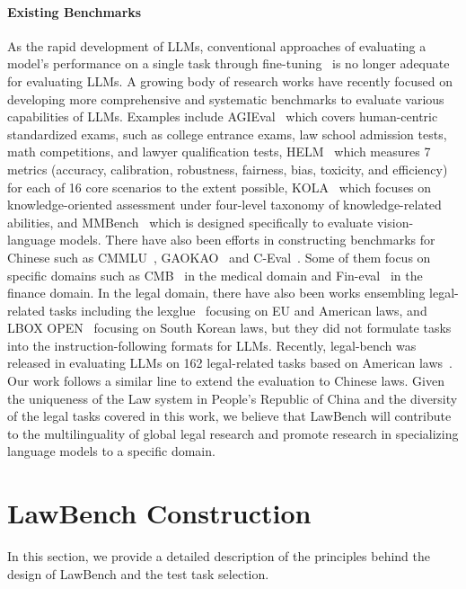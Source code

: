 \paragraph{Existing Benchmarks}

As the rapid development of LLMs, conventional approaches of evaluating a model's performance on a single task through fine-tuning~\cite{xu2020clue,wang2018glue,louis2022statutory,zhang2022mdia,shen2023xpqa} is no longer adequate for evaluating LLMs. A growing body of research works have recently focused on developing more comprehensive and systematic benchmarks to evaluate various capabilities of LLMs. Examples include AGIEval~\cite{zhong2023agieval} which covers human-centric standardized exams, such as college entrance exams, law school admission tests, math competitions, and lawyer qualification tests, HELM~\cite{liang2022holistic} which measures 7 metrics (accuracy, calibration, robustness,
fairness, bias, toxicity, and efficiency) for each of 16 core scenarios to the extent possible, KOLA~\cite{yu2023kola} which focuses on knowledge-oriented assessment under four-level taxonomy of knowledge-related abilities, and MMBench~\cite{liu2023mmbench} which is designed specifically to evaluate vision-language models. There have also been efforts in constructing benchmarks for Chinese such as CMMLU~\cite{li2023cmmlu}, GAOKAO~\cite{zhang2023evaluating} and C-Eval~\cite{huang2023c}. Some of them focus on specific domains such as CMB~\cite{wang2023cmb} in the medical domain and Fin-eval~\cite{zhang2023fineval} in the finance domain. In the legal domain, there have also been works ensembling legal-related tasks including the lexglue~\cite{chalkidis2022lexglue} focusing on EU and American laws, and LBOX OPEN~\cite{hwang2022multi} focusing on South Korean laws, but they did not formulate tasks into the instruction-following formats for LLMs. Recently, legal-bench was released in evaluating LLMs on 162 legal-related tasks based on American laws~\cite{guha2023legalbench}. Our work follows a similar line to extend the evaluation to Chinese laws. Given the uniqueness of the Law system in People's Republic of China and the diversity of the legal tasks covered in this work, we believe
that LawBench will contribute to the multilinguality of global legal research and promote research in specializing language models to a specific domain.

\section{LawBench Construction}
In this section, we provide a detailed description of the principles behind the design of LawBench and the test task selection.

